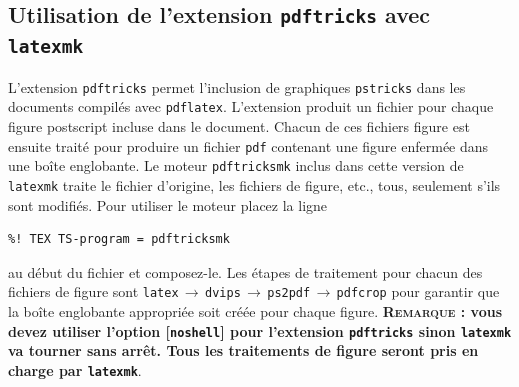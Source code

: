 \documentclass[11pt,french]{article}
\newcommand{\To}{\,\(\to\)\,}
\begin{document}
%


\subsection{Utilisation de l'extension \texttt{pdftricks} avec \texttt{latexmk}}

L'extension \texttt{pdftricks} permet l'inclusion de graphiques \texttt{pstricks} dans les documents compilés avec \texttt{pdflatex}. L'extension produit un fichier pour chaque figure postscript incluse dans le document. Chacun de ces fichiers figure est ensuite traité pour produire un fichier \texttt{pdf} contenant une figure enfermée dans une boîte englobante. Le moteur \texttt{pdftricksmk} inclus dans cette version de \texttt{latexmk} traite le fichier d'origine, les fichiers de figure, etc., tous, seulement s'ils sont modifiés. Pour utiliser le moteur placez la ligne
\begin{verbatim}
%! TEX TS-program = pdftricksmk
\end{verbatim}
au début du fichier et composez-le. Les étapes de traitement pour chacun des fichiers de figure sont \texttt{latex}\To\texttt{dvips}\To\texttt{ps2pdf}\To\texttt{pdfcrop} pour garantir que la boîte englobante appropriée soit créée pour chaque figure. \textbf{\textsc{Remarque} : vous devez utiliser l'option [\texttt{noshell}] pour l'extension \texttt{pdftricks} sinon \texttt{latexmk} va tourner sans arrêt. Tous les traitements de figure seront pris en charge par \texttt{latexmk}}.
\end{document}
